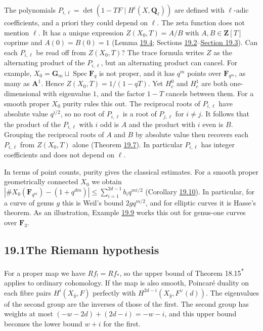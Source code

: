 \documentclass[11pt]{article}
\newcommand{\bpout}[1]{#1\textsuperscript{\hyperlink{bp-outside}{\ensuremath{\ast}}}}
\begin{document}
The polynomials \(P_{i,\ell}=\det(1-TF\mid H^i(X,\mathbf Q_\ell))\) are defined with \(\ell\)-adic coefficients, and a priori they could depend on \(\ell\). The zeta function does not mention \(\ell\). It has a unique expression \(Z(X_0,T)=A/B\) with \(A,B\in\mathbf Z[T]\) coprime and \(A(0)=B(0)=1\) (Lemma \hyperref[bp15]{19.4}; Sections \hyperref[bp10]{19.2}–\hyperref[bp18]{Section 19.3}). Can each \(P_{i,\ell}\) be read off from \(Z(X_0,T)\)? The trace formula writes \(Z\) as the alternating product of the \(P_{i,\ell}\), but an alternating product can cancel. For example, \(X_0=\mathbf G_m\sqcup
\operatorname{Spec}\mathbf F_q\) is not proper, and it has \(q^m\) points over \(\mathbf F_{q^m}\), as many as \(\mathbf A^1\). Hence \(Z(X_0,T)=1/(1-qT)\). Yet \(H^0_c\) and \(H^1_c\) are both one-dimensional with eigenvalue \(1\), and the factor \(1-T\) cancels between them. For a smooth proper \(X_0\) purity rules this out. The reciprocal roots of \(P_{i,\ell}\) have absolute value \(q^{i/2}\), so no root of \(P_{i,\ell}\) is a root of \(P_{j,\ell}\) for \(i\neq j\). It follows that the product of the \(P_{i,\ell}\) with \(i\) odd is \(A\) and the product with \(i\) even is \(B\). Grouping the reciprocal roots of \(A\) and \(B\) by absolute value then recovers each \(P_{i,\ell}\) from \(Z(X_0,T)\) alone (Theorem \hyperref[bp24]{19.7}). In particular \(P_{i,\ell}\) has integer coefficients and does not depend on \(\ell\).

In terms of point counts, purity gives the classical estimates. For a smooth proper geometrically connected \(X_0\) we obtain \(|\#X_0(\mathbf F_{q^m})-(1+q^{dm})|\le\sum_{i=1}^{2d-1}b_iq^{mi/2}\) (Corollary \hyperref[bp30]{19.10}). In particular, for a curve of genus \(g\) this is Weil's bound \(2gq^{m/2}\), and for elliptic curves it is Hasse's theorem. As an illustration, Example \hyperref[bp28]{19.9} works this out for genus-one curves over \(\mathbf F_3\).

\subsection*{\texorpdfstring{19.1\quad The Riemann hypothesis}{19.1 The Riemann hypothesis}}
\label{bp3}%
\label{bp4}%
For a proper map we have \(Rf_!=Rf_*\), so the upper bound of Theorem \bpout{18.15} applies to ordinary cohomology. If the map is also smooth, Poincaré duality on each fibre pairs \(H^i(X_{\bar y},F)\) perfectly with \(H^{2d-i}(X_{\bar y},F^\vee(d))\). The eigenvalues of the second group are the inverses of those of the first. The second group has weights at most \((-w-2d)+(2d-i)=-w-i\), and this upper bound becomes the lower bound \(w+i\) for the first.
\end{document}
